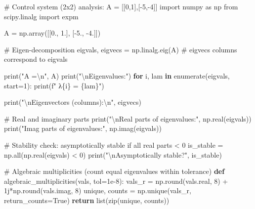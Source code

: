 \documentclass[
  letterpaper,
  DIV=11,
  numbers=noendperiod]{scrreprt}
\newenvironment{Shaded}{\begin{snugshade}}{\end{snugshade}}
\newcommand{\BuiltInTok}[1]{\textcolor[rgb]{0.00,0.23,0.31}{#1}}
\newcommand{\CharTok}[1]{\textcolor[rgb]{0.13,0.47,0.30}{#1}}
\newcommand{\CommentTok}[1]{\textcolor[rgb]{0.37,0.37,0.37}{#1}}
\newcommand{\ControlFlowTok}[1]{\textcolor[rgb]{0.00,0.23,0.31}{\textbf{#1}}}
\newcommand{\DecValTok}[1]{\textcolor[rgb]{0.68,0.00,0.00}{#1}}
\newcommand{\FloatTok}[1]{\textcolor[rgb]{0.68,0.00,0.00}{#1}}
\newcommand{\ImportTok}[1]{\textcolor[rgb]{0.00,0.46,0.62}{#1}}
\newcommand{\KeywordTok}[1]{\textcolor[rgb]{0.00,0.23,0.31}{\textbf{#1}}}
\newcommand{\NormalTok}[1]{\textcolor[rgb]{0.00,0.23,0.31}{#1}}
\newcommand{\OperatorTok}[1]{\textcolor[rgb]{0.37,0.37,0.37}{#1}}
\newcommand{\OtherTok}[1]{\textcolor[rgb]{0.00,0.23,0.31}{#1}}
\newcommand{\SpecialCharTok}[1]{\textcolor[rgb]{0.37,0.37,0.37}{#1}}
\newcommand{\SpecialStringTok}[1]{\textcolor[rgb]{0.13,0.47,0.30}{#1}}
\newcommand{\StringTok}[1]{\textcolor[rgb]{0.13,0.47,0.30}{#1}}
\newcommand{\VariableTok}[1]{\textcolor[rgb]{0.07,0.07,0.07}{#1}}
\begin{document}
\begin{Shaded}
\begin{Highlighting}[]
\CommentTok{\# Control system (2x2) analysis: A = [[0,1],[{-}5,{-}4]]}
\ImportTok{import}\NormalTok{ numpy }\ImportTok{as}\NormalTok{ np}
\ImportTok{from}\NormalTok{ scipy.linalg }\ImportTok{import}\NormalTok{ expm}

\NormalTok{A }\OperatorTok{=}\NormalTok{ np.array([[}\FloatTok{0.}\NormalTok{, }\FloatTok{1.}\NormalTok{],}
\NormalTok{              [}\OperatorTok{{-}}\FloatTok{5.}\NormalTok{, }\OperatorTok{{-}}\FloatTok{4.}\NormalTok{]])}

\CommentTok{\# Eigen{-}decomposition}
\NormalTok{eigvals, eigvecs }\OperatorTok{=}\NormalTok{ np.linalg.eig(A)   }\CommentTok{\# eigvecs columns correspond to eigvals}

\BuiltInTok{print}\NormalTok{(}\StringTok{"A =}\CharTok{\textbackslash{}n}\StringTok{"}\NormalTok{, A)}
\BuiltInTok{print}\NormalTok{(}\StringTok{"}\CharTok{\textbackslash{}n}\StringTok{Eigenvalues:"}\NormalTok{)}
\ControlFlowTok{for}\NormalTok{ i, lam }\KeywordTok{in} \BuiltInTok{enumerate}\NormalTok{(eigvals, start}\OperatorTok{=}\DecValTok{1}\NormalTok{):}
    \BuiltInTok{print}\NormalTok{(}\SpecialStringTok{f"  λ}\SpecialCharTok{\{}\NormalTok{i}\SpecialCharTok{\}}\SpecialStringTok{ = }\SpecialCharTok{\{}\NormalTok{lam}\SpecialCharTok{\}}\SpecialStringTok{"}\NormalTok{)}

\BuiltInTok{print}\NormalTok{(}\StringTok{"}\CharTok{\textbackslash{}n}\StringTok{Eigenvectors (columns):}\CharTok{\textbackslash{}n}\StringTok{"}\NormalTok{, eigvecs)}

\CommentTok{\# Real and imaginary parts}
\BuiltInTok{print}\NormalTok{(}\StringTok{"}\CharTok{\textbackslash{}n}\StringTok{Real parts of eigenvalues:"}\NormalTok{, np.real(eigvals))}
\BuiltInTok{print}\NormalTok{(}\StringTok{"Imag parts of eigenvalues:"}\NormalTok{, np.imag(eigvals))}

\CommentTok{\# Stability check: asymptotically stable if all real parts \textless{} 0}
\NormalTok{is\_stable }\OperatorTok{=}\NormalTok{ np.}\BuiltInTok{all}\NormalTok{(np.real(eigvals) }\OperatorTok{\textless{}} \DecValTok{0}\NormalTok{)}
\BuiltInTok{print}\NormalTok{(}\StringTok{"}\CharTok{\textbackslash{}n}\StringTok{Asymptotically stable?"}\NormalTok{, is\_stable)}

\CommentTok{\# Algebraic multiplicities (count equal eigenvalues within tolerance)}
\KeywordTok{def}\NormalTok{ algebraic\_multiplicities(vals, tol}\OperatorTok{=}\FloatTok{1e{-}8}\NormalTok{):}
\NormalTok{    vals\_r }\OperatorTok{=}\NormalTok{ np.}\BuiltInTok{round}\NormalTok{(vals.real, }\DecValTok{8}\NormalTok{) }\OperatorTok{+} \OtherTok{1j}\OperatorTok{*}\NormalTok{np.}\BuiltInTok{round}\NormalTok{(vals.imag, }\DecValTok{8}\NormalTok{)}
\NormalTok{    unique, counts }\OperatorTok{=}\NormalTok{ np.unique(vals\_r, return\_counts}\OperatorTok{=}\VariableTok{True}\NormalTok{)}
    \ControlFlowTok{return} \BuiltInTok{list}\NormalTok{(}\BuiltInTok{zip}\NormalTok{(unique, counts))}


\end{Highlighting}
\end{Shaded}
\end{document}
